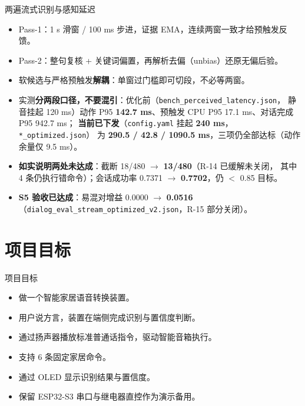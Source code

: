 \documentclass[10pt]{beamer}
\begin{document}
\begin{frame}{两遍流式识别与感知延迟}
    \begin{itemize}
        \item Pass-1：1 s 滑窗 / 100 ms 步进，证据 EMA，连续两窗一致才给预触发反馈。
        \item Pass-2：整句复核 + 关键词偏置，再解析去偏（unbias）还原无偏后验。
        \item 软候选与严格预触发\textbf{解耦}：单窗过门槛即可切段，不必等两窗。
        \item 实测\textbf{分两段口径，不要混引}：优化前（\texttt{bench\_perceived\_latency.json}，
              静音挂起 120 ms）动作 P95 \textbf{142.7 ms}、预触发 CPU P95 17.1 ms、对话完成 P95 942.7 ms；
              \textbf{当前已下发}（\texttt{config.yaml} 挂起 \textbf{240 ms}，\texttt{*\_optimized.json}）
              为 \textbf{290.5 / 42.8 / 1090.5 ms}，三项仍全部达标（动作余量仅 9.5 ms）。
        \item \textbf{如实说明两处未达成}：截断 18/480 $\rightarrow$ \textbf{13/480}（R-14 已缓解未关闭，
              其中 4 条仍执行错命令）；会话成功率 0.7371 $\rightarrow$ \textbf{0.7702}，仍 $<$ 0.85 目标。
        \item \textbf{S5 验收已达成}：易混对增益 0.0000 $\rightarrow$ \textbf{0.0516}
              （\texttt{dialog\_eval\_stream\_optimized\_v2.json}，R-15 部分关闭）。
    \end{itemize}
\end{frame}
\section{项目目标}
\begin{frame}{项目目标}
    \begin{itemize}
        \item 做一个智能家居语音转换装置。
        \item 用户说方言，装置在端侧完成识别与置信度判断。
        \item 通过扬声器播放标准普通话指令，驱动智能音箱执行。
        \item 支持 6 条固定家居命令。
        \item 通过 OLED 显示识别结果与置信度。
        \item 保留 ESP32-S3 串口与继电器直控作为演示备用。
    \end{itemize}
\end{frame}
\end{document}

